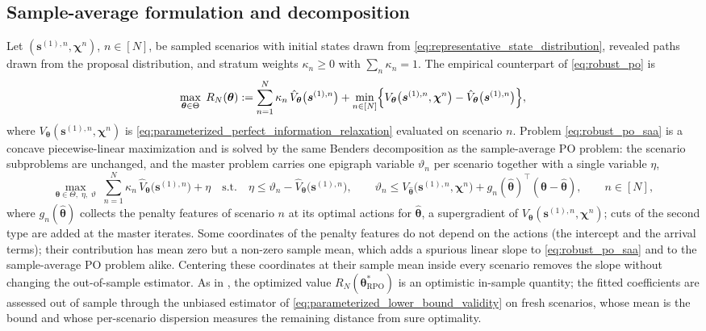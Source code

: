 \documentclass[11pt]{article}
\theoremstyle{definition}
\begin{document}
\subsection{Sample-average formulation and decomposition}

Let \((\boldsymbol{s}^{(1),n},\boldsymbol{\chi}^{n})\), \(n\in[N]\), be sampled scenarios with initial states drawn from \eqref{eq:representative_state_distribution}, revealed paths drawn from the proposal distribution, and stratum weights \(\kappa_n\ge0\) with \(\sum_n\kappa_n=1\). The empirical counterpart of \eqref{eq:robust_po} is
\begin{equation}
\label{eq:robust_po_saa}
\max_{\boldsymbol{\theta}\in\Theta}\;
R_N(\boldsymbol{\theta}):=\sum_{n=1}^{N}\kappa_n\,\hat V_{\boldsymbol{\theta}}\bigl(\boldsymbol{s}^{(1),n}\bigr)
+\min_{n\in[N]}\Bigl\{V_{\boldsymbol{\theta}}\bigl(\boldsymbol{s}^{(1),n},\boldsymbol{\chi}^{n}\bigr)-\hat V_{\boldsymbol{\theta}}\bigl(\boldsymbol{s}^{(1),n}\bigr)\Bigr\},
\end{equation}
where \(V_{\boldsymbol{\theta}}(\boldsymbol{s}^{(1),n},\boldsymbol{\chi}^{n})\) is \eqref{eq:parameterized_perfect_information_relaxation} evaluated on scenario \(n\). Problem \eqref{eq:robust_po_saa} is a concave piecewise-linear maximization and is solved by the same Benders decomposition as the sample-average PO problem: the scenario subproblems are unchanged, and the master problem carries one epigraph variable \(\vartheta_n\) per scenario together with a single variable \(\eta\),
\begin{equation}
\label{eq:robust_po_master}
\max_{\boldsymbol{\theta}\in\Theta,\;\eta,\;\vartheta}\;
\sum_{n=1}^{N}\kappa_n\,\hat V_{\boldsymbol{\theta}}\bigl(\boldsymbol{s}^{(1),n}\bigr)+\eta
\quad\text{s.t.}\quad
\eta\le\vartheta_n-\hat V_{\boldsymbol{\theta}}\bigl(\boldsymbol{s}^{(1),n}\bigr),\qquad
\vartheta_n\le V_{\hat{\boldsymbol{\theta}}}\bigl(\boldsymbol{s}^{(1),n},\boldsymbol{\chi}^{n}\bigr)+g_n(\hat{\boldsymbol{\theta}})^{\top}(\boldsymbol{\theta}-\hat{\boldsymbol{\theta}}),
\qquad n\in[N],
\end{equation}
where \(g_n(\hat{\boldsymbol{\theta}})\) collects the penalty features of scenario \(n\) at its optimal actions for \(\hat{\boldsymbol{\theta}}\), a supergradient of \(V_{\boldsymbol{\theta}}(\boldsymbol{s}^{(1),n},\boldsymbol{\chi}^{n})\); cuts of the second type are added at the master iterates. Some coordinates of the penalty features do not depend on the actions (the intercept and the arrival terms); their contribution has mean zero but a non-zero sample mean, which adds a spurious linear slope to \eqref{eq:robust_po_saa} and to the sample-average PO problem alike. Centering these coordinates at their sample mean inside every scenario removes the slope without changing the out-of-sample estimator. As in \citet{belomestny2019}, the optimized value \(R_N(\boldsymbol\theta_{\mathrm{RPO}}^*)\) is an optimistic in-sample quantity; the fitted coefficients are assessed out of sample through the unbiased estimator of \eqref{eq:parameterized_lower_bound_validity} on fresh scenarios, whose mean is the bound and whose per-scenario dispersion measures the remaining distance from sure optimality.
\end{document}
